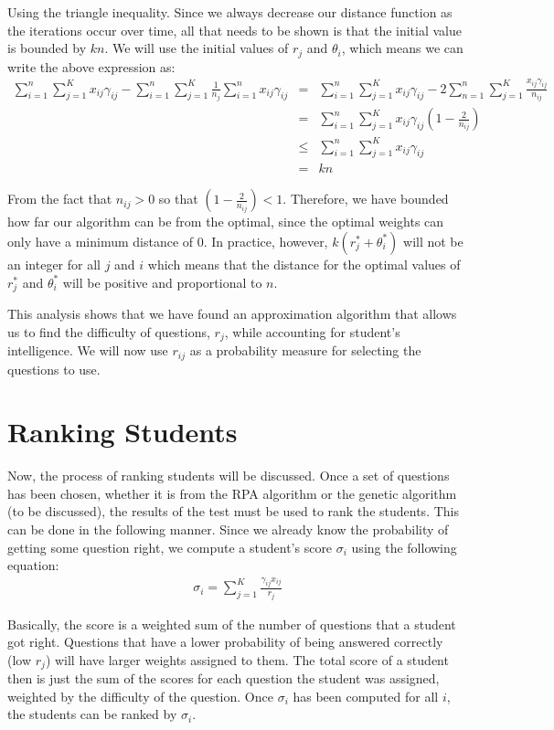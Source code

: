 \documentclass[psamsfonts]{amsart}
\begin{document}
Using the triangle inequality. Since we always decrease our distance function as the iterations occur over time, all that needs to be shown is that the initial value is bounded by $kn$. We will use the initial values of $r_j$ and $\theta_i$, which means we can write the above expression as: 
\begin{eqnarray}
\sum_{i=1}^n \sum_{j=1}^K x_{ij} \gamma_{ij} - \sum_{i=1}^n \sum_{j=1}^K \frac{1}{n_j} \sum_{i=1}^n x_{ij} \gamma_{ij} &=& \sum_{i=1}^n \sum_{j=1}^K x_{ij} \gamma_{ij} - 2 \sum_{n=1}^n \sum_{j=1}^K \frac{x_{ij} \gamma_{ij}}{n_{ij}} \\ 
&=& \sum_{i=1}^n \sum_{j=1}^K x_{ij} \gamma_{ij} \left( 1 - \frac{2}{n_{ij}} \right) \\
&\leq& \sum_{i=1}^n \sum_{j=1}^K x_{ij} \gamma_{ij} \\
&=& kn
\end{eqnarray}

From the fact that $n_{ij} > 0$ so that $(1 - \frac{2}{n_{ij}} )< 1$. Therefore, we have bounded how far our algorithm can be from the optimal, since the optimal weights can only have a minimum distance of 0. In practice, however, $k(r^*_j + \theta^*_i)$ will not be an integer for all $j$ and $i$ which means that the distance for the optimal values of $r^*_j$ and $\theta^*_i$ will be positive and proportional to $n$. 

This analysis shows that we have found an approximation algorithm that allows us to find the difficulty of questions, $r_{j}$, while accounting for student's intelligence. We will now use $r_{ij}$ as a probability measure for selecting the questions to use.

\section{Ranking Students}

Now, the process of ranking students will be discussed. Once a set of questions has been chosen, whether it is from the RPA algorithm or the genetic algorithm (to be discussed), the results of the test must be used to rank the students. This can be done in the following manner. Since we already know the probability of getting some question right, we compute a student's score $\sigma_i$ using the following equation:
\begin{eqnarray}
\sigma_i = \sum_{j=1}^K \frac{\gamma_{ij} x_{ij}}{r_j}
\end{eqnarray}

Basically, the score is a weighted sum of the number of questions that a student got right. Questions that have a lower probability of being answered correctly (low $r_j$) will have larger weights assigned to them. The total score of a student then is just the sum of the scores for each question the student was assigned, weighted by the difficulty of the question. Once $\sigma_i$ has been computed for all $i$, the students can be ranked by $\sigma_i$. 
\end{document}
